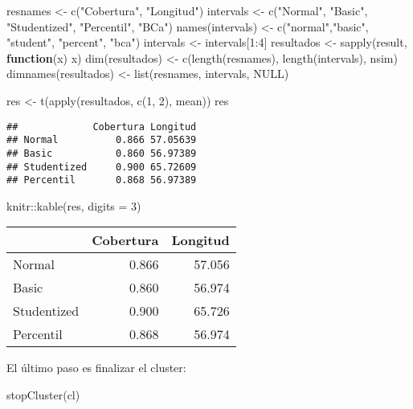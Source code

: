 \documentclass[
]{book}
\newenvironment{Shaded}{\begin{snugshade}}{\end{snugshade}}
\newcommand{\AttributeTok}[1]{\textcolor[rgb]{0.77,0.63,0.00}{#1}}
\newcommand{\ConstantTok}[1]{\textcolor[rgb]{0.00,0.00,0.00}{#1}}
\newcommand{\ControlFlowTok}[1]{\textcolor[rgb]{0.13,0.29,0.53}{\textbf{#1}}}
\newcommand{\DecValTok}[1]{\textcolor[rgb]{0.00,0.00,0.81}{#1}}
\newcommand{\FunctionTok}[1]{\textcolor[rgb]{0.00,0.00,0.00}{#1}}
\newcommand{\NormalTok}[1]{#1}
\newcommand{\OtherTok}[1]{\textcolor[rgb]{0.56,0.35,0.01}{#1}}
\newcommand{\SpecialCharTok}[1]{\textcolor[rgb]{0.00,0.00,0.00}{#1}}
\newcommand{\StringTok}[1]{\textcolor[rgb]{0.31,0.60,0.02}{#1}}
\theoremstyle{break}
\theoremstyle{definition}
\theoremstyle{definition}
\theoremstyle{definition}
\theoremstyle{definition}
\theoremstyle{remark}
\begin{document}
\begin{Shaded}
\begin{Highlighting}[]
\NormalTok{resnames }\OtherTok{\textless{}{-}} \FunctionTok{c}\NormalTok{(}\StringTok{"Cobertura"}\NormalTok{, }\StringTok{"Longitud"}\NormalTok{)}
\NormalTok{intervals }\OtherTok{\textless{}{-}} \FunctionTok{c}\NormalTok{(}\StringTok{"Normal"}\NormalTok{, }\StringTok{"Basic"}\NormalTok{, }\StringTok{"Studentized"}\NormalTok{, }\StringTok{"Percentil"}\NormalTok{, }\StringTok{"BCa"}\NormalTok{)}
\FunctionTok{names}\NormalTok{(intervals) }\OtherTok{\textless{}{-}} \FunctionTok{c}\NormalTok{(}\StringTok{"normal"}\NormalTok{,}\StringTok{"basic"}\NormalTok{, }\StringTok{"student"}\NormalTok{, }\StringTok{"percent"}\NormalTok{, }\StringTok{"bca"}\NormalTok{)}
\NormalTok{intervals }\OtherTok{\textless{}{-}}\NormalTok{ intervals[}\DecValTok{1}\SpecialCharTok{:}\DecValTok{4}\NormalTok{]}
\NormalTok{resultados }\OtherTok{\textless{}{-}} \FunctionTok{sapply}\NormalTok{(result, }\ControlFlowTok{function}\NormalTok{(x) x)}
\FunctionTok{dim}\NormalTok{(resultados) }\OtherTok{\textless{}{-}} \FunctionTok{c}\NormalTok{(}\FunctionTok{length}\NormalTok{(resnames), }\FunctionTok{length}\NormalTok{(intervals), nsim)}
\FunctionTok{dimnames}\NormalTok{(resultados) }\OtherTok{\textless{}{-}} \FunctionTok{list}\NormalTok{(resnames, intervals, }\ConstantTok{NULL}\NormalTok{)}

\NormalTok{res }\OtherTok{\textless{}{-}} \FunctionTok{t}\NormalTok{(}\FunctionTok{apply}\NormalTok{(resultados, }\FunctionTok{c}\NormalTok{(}\DecValTok{1}\NormalTok{, }\DecValTok{2}\NormalTok{), mean))}
\NormalTok{res}
\end{Highlighting}
\end{Shaded}

\begin{verbatim}
##             Cobertura Longitud
## Normal          0.866 57.05639
## Basic           0.860 56.97389
## Studentized     0.900 65.72609
## Percentil       0.868 56.97389
\end{verbatim}

\begin{Shaded}
\begin{Highlighting}[]
\NormalTok{knitr}\SpecialCharTok{::}\FunctionTok{kable}\NormalTok{(res, }\AttributeTok{digits =} \DecValTok{3}\NormalTok{)}
\end{Highlighting}
\end{Shaded}

\begin{tabular}{l|r|r}
\hline
  & Cobertura & Longitud\\
\hline
Normal & 0.866 & 57.056\\
\hline
Basic & 0.860 & 56.974\\
\hline
Studentized & 0.900 & 65.726\\
\hline
Percentil & 0.868 & 56.974\\
\hline
\end{tabular}

El último paso es finalizar el cluster:

\begin{Shaded}
\begin{Highlighting}[]
\FunctionTok{stopCluster}\NormalTok{(cl)}
\end{Highlighting}
\end{Shaded}


  
\end{document}
